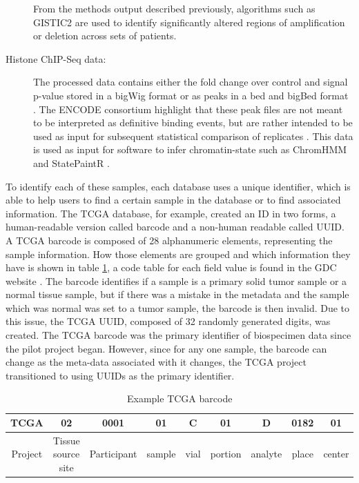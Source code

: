 \begin{description}
  From the  methods output described previously, algorithms such as GISTIC2 \cite{mermel2011gistic2} are used to identify significantly altered regions of amplification or deletion across sets of patients.
  \item [Histone ChIP-Seq data:] The processed data contains either the fold change over control and signal p-value stored
  in a bigWig format or as peaks in a bed and bigBed format \cite{ENCODE_chipseq}.  The ENCODE consortium highlight that these peak files are not meant to be interpreted as definitive binding events, but are rather intended to be used as input for subsequent statistical comparison of replicates \cite{ENCODE_chipseq}. This data is used as input for software
   to infer chromatin-state such as ChromHMM \cite{ernst2012chromhmm} and StatePaintR \cite{statepaintr}.
\end{description}

To identify each of these samples, each database uses a unique identifier, which is able
to help users to find a certain sample in the database or to find associated information.
The TCGA database, for example, created an ID in two forms, a human-readable version called barcode and
a non-human readable called UUID. A TCGA barcode is composed of 28 alphanumeric elements, representing
the sample information. How those elements are grouped and which information they have is shown in table \ref{tab:barcode}, a code table for each field value is found in the GDC website \cite{gdc_code_table}.
The barcode identifies if a sample is a primary solid tumor sample or a normal tissue sample,
but if there was a mistake in the metadata and the sample which was normal was set to a tumor sample,
the barcode is then invalid. Due to this issue, the TCGA UUID, composed of 32 randomly generated digits, was created.
The TCGA barcode was the primary identifier of biospecimen data since the pilot project began. However, since for any one sample, the barcode can change as the meta-data associated with it changes, the TCGA project transitioned to using UUIDs as the primary identifier.

\begin{table}[]
\centering
\caption{Example TCGA barcode}
\label{tab:barcode}
\begin{tabular}{|c|c|c|c|c|c|c|c|c|}
\hline
TCGA    & 02                 & 0001        & 01     & C    & 01      & D       & 0182  & 01     \\ \hline
Project & Tissue source site & Participant & sample & vial & portion & analyte & place & center \\ \hline
\end{tabular}
\end{table}



